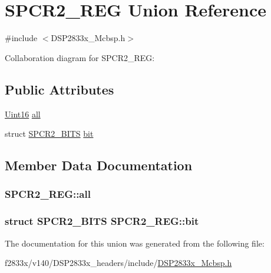 \hypertarget{union_s_p_c_r2___r_e_g}{}\section{S\+P\+C\+R2\+\_\+\+R\+E\+G Union Reference}
\label{union_s_p_c_r2___r_e_g}


{\ttfamily \#include $<$D\+S\+P2833x\+\_\+\+Mcbsp.\+h$>$}



Collaboration diagram for S\+P\+C\+R2\+\_\+\+R\+E\+G\+:
\subsection*{Public Attributes}
\begin{DoxyCompactItemize}
\item 
\hyperlink{_d_s_p2833x___device_8h_a59a9f6be4562c327cbfb4f7e8e18f08b}{Uint16} \hyperlink{union_s_p_c_r2___r_e_g_a33905ed5bec594bd4940c188d8518d50}{all}
\item 
struct \hyperlink{struct_s_p_c_r2___b_i_t_s}{S\+P\+C\+R2\+\_\+\+B\+I\+T\+S} \hyperlink{union_s_p_c_r2___r_e_g_a8527f708954e6c073e88722be9891f12}{bit}
\end{DoxyCompactItemize}


\subsection{Member Data Documentation}
\hypertarget{union_s_p_c_r2___r_e_g_a33905ed5bec594bd4940c188d8518d50}{}
\subsubsection[{all}]{ S\+P\+C\+R2\+\_\+\+R\+E\+G\+::all}\label{union_s_p_c_r2___r_e_g_a33905ed5bec594bd4940c188d8518d50}
\hypertarget{union_s_p_c_r2___r_e_g_a8527f708954e6c073e88722be9891f12}{}
\subsubsection[{bit}]{\setlength{\rightskip}{0pt plus 5cm}struct {\bf S\+P\+C\+R2\+\_\+\+B\+I\+T\+S} S\+P\+C\+R2\+\_\+\+R\+E\+G\+::bit}\label{union_s_p_c_r2___r_e_g_a8527f708954e6c073e88722be9891f12}


The documentation for this union was generated from the following file\+:\begin{DoxyCompactItemize}
\item 
f2833x/v140/\+D\+S\+P2833x\+\_\+headers/include/\hyperlink{_d_s_p2833x___mcbsp_8h}{D\+S\+P2833x\+\_\+\+Mcbsp.\+h}\end{DoxyCompactItemize}

